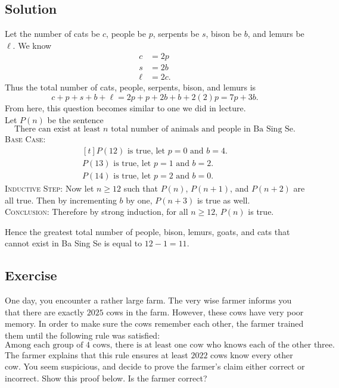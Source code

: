 \documentclass{article}
\newcounter{counter}
\newcommand{\Exercise}{Exercise \stepcounter{counter}\thecounter}
\begin{document}
\subsection*{Solution}
    Let the number of cats be $c$, people be $p$, serpents be $s$, bison be $b$, and lemurs be $\ell$. We know
    \begin{align*}
        c &= 2p \\
        s &= 2b \\
        \ell &= 2c.
    \end{align*}
    Thus the total number of cats, people, serpents, bison, and lemurs is $$c + p + s + b + \ell = 2p + p + 2b + b + 2(2)p = 7p + 3b.$$ From here, this question becomes similar to one we did in lecture. \\
    Let $P(n)$ be the sentence $$\text{There can exist at least $n$ total number of animals and people in Ba Sing Se}.$$
    \textsc{Base Case}: 
    $$\begin{aligned}[t]
        \text{$P(12)$ is true, let $p = 0$ and $b = 4$.} \\
        \text{$P(13)$ is true, let $p = 1$ and $b = 2$.} \\
        \text{$P(14)$ is true, let $p = 2$ and $b = 0$.}
    \end{aligned}$$
    \textsc{Inductive Step}: Now let $n \ge 12$ such that $P(n)$, $P(n + 1)$, and $P(n + 2)$ are all true. Then by incrementing $b$ by one, $P(n + 3)$ is true as well. \\
    \textsc{Conclusion}: Therefore by strong induction, for all $n \ge 12$, $P(n)$ is true. 
    
    \vspace{3mm} Hence the greatest total number of people, bison, lemurs, goats, and cats that cannot exist in Ba Sing Se is equal to $12 - 1 = \boxed{11}$.

\subsection*{\Exercise}
    One day, you encounter a rather large farm. The very wise farmer informs you that there are exactly $2025$ cows in the farm. However, these cows have very poor memory. In order to make sure the cows remember each other, the farmer trained them until the following rule was satisfied: $$\text{Among each group of $4$ cows, there is at least one cow who knows each of the other three.}$$ The farmer explains that this rule ensures at least $2022$ cows know every other cow. You seem suspicious, and decide to prove the farmer's claim either correct or incorrect. Show this proof below. Is the farmer correct?
    
\end{document}
